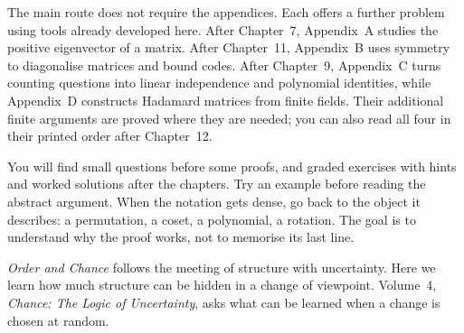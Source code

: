 The main route does not require the appendices. Each offers a further problem
using tools already developed here. After Chapter~7, Appendix~A studies the
positive eigenvector of a matrix. After Chapter~11, Appendix~B uses symmetry
to diagonalise matrices and bound codes. After Chapter~9, Appendix~C turns
counting questions into linear independence and polynomial identities, while
Appendix~D constructs Hadamard matrices from finite fields. Their additional
finite arguments are proved where they are needed; you can also read all four
in their printed order after Chapter~12.

You will find small questions before some proofs, and graded exercises with hints and worked solutions after the chapters. Try an example before reading the abstract argument. When the notation gets dense, go back to the object it describes: a permutation, a coset, a polynomial, a rotation. The goal is to understand why the proof works, not to memorise its last line.

\emph{Order and Chance} follows the meeting of structure with uncertainty. Here we learn how much structure can be hidden in a change of viewpoint. Volume~4, \emph{Chance: The Logic of Uncertainty}, asks what can be learned when a change is chosen at random.
